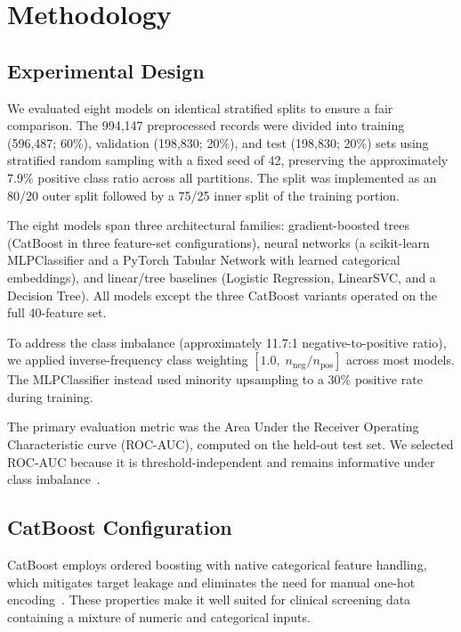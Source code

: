 \section{Methodology}
\label{sec:methodology}

\subsection{Experimental Design}
\label{subsec:experimental-design}

We evaluated eight models on identical stratified splits to ensure a fair comparison. The 994,147 preprocessed records were divided into training (596,487; 60\%), validation (198,830; 20\%), and test (198,830; 20\%) sets using stratified random sampling with a fixed seed of 42, preserving the approximately 7.9\% positive class ratio across all partitions. The split was implemented as an 80/20 outer split followed by a 75/25 inner split of the training portion.

The eight models span three architectural families: gradient-boosted trees (CatBoost in three feature-set configurations), neural networks (a scikit-learn MLPClassifier and a PyTorch Tabular Network with learned categorical embeddings), and linear/tree baselines (Logistic Regression, LinearSVC, and a Decision Tree). All models except the three CatBoost variants operated on the full 40-feature set.

To address the class imbalance (approximately 11.7:1 negative-to-positive ratio), we applied inverse-frequency class weighting $[1.0,\; n_{\text{neg}} / n_{\text{pos}}]$ across most models. The MLPClassifier instead used minority upsampling to a 30\% positive rate during training.

The primary evaluation metric was the Area Under the Receiver Operating Characteristic curve (ROC-AUC), computed on the held-out test set. We selected ROC-AUC because it is threshold-independent and remains informative under class imbalance~\cite{Richardson2024roc}.

\subsection{CatBoost Configuration}
\label{subsec:catboost-config}

CatBoost employs ordered boosting with native categorical feature handling, which mitigates target leakage and eliminates the need for manual one-hot encoding~\cite{Prokhorenkova2018catboost}. These properties make it well suited for clinical screening data containing a mixture of numeric and categorical inputs.


